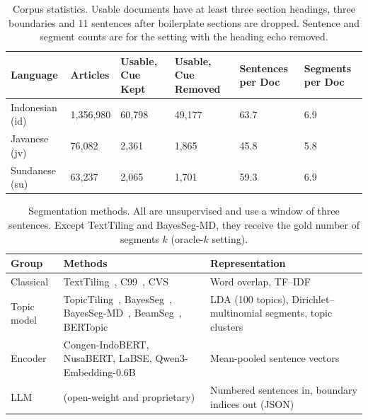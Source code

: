 \begin{table}[H]
\caption{Corpus statistics. Usable documents have at least three section headings, three boundaries and 11 sentences after boilerplate sections are dropped. Sentence and segment counts are for the setting with the heading echo removed.\label{tab:corpus}}
\begin{tabularx}{\textwidth}{lCCCCC}
\toprule
\textbf{Language} & \textbf{Articles} & \textbf{Usable, Cue Kept} & \textbf{Usable, Cue Removed} & \textbf{Sentences per Doc} & \textbf{Segments per Doc}\\
\midrule
Indonesian (id) & 1,356,980 & 60,798 & 49,177 & 63.7 & 6.9\\
Javanese (jv)   & 76,082    & 2,361  & 1,865  & 45.8 & 5.8\\
Sundanese (su)  & 63,237    & 2,065  & 1,701  & 59.3 & 6.9\\
\bottomrule
\end{tabularx}
\end{table}

\begin{table}[H]
\caption{Segmentation methods. All are unsupervised and use a window of three sentences. Except TextTiling and BayesSeg-MD, they receive the gold number of segments $k$ (oracle-$k$ setting).\label{tab:methods}}
\begin{tabularx}{\textwidth}{lLL}
\toprule
\textbf{Group} & \textbf{Methods} & \textbf{Representation}\\
\midrule
Classical   & TextTiling~\cite{hearst1997}, C99~\cite{choi2000}, CVS~\cite{alemi2015} & Word overlap, TF--IDF\\
Topic model & TopicTiling~\cite{riedl2012}, BayesSeg~\cite{du2013}, BayesSeg-MD~\cite{mota2016}, BeamSeg~\cite{mota2019}, BERTopic~\cite{grootendorst2022} & LDA (100 topics), Dirichlet--multinomial segments, topic clusters\\
Encoder     & Congen-IndoBERT, NusaBERT, LaBSE, Qwen3-Embedding-0.6B & Mean-pooled sentence vectors\\
LLM         & \tbd{} (open-weight and proprietary) & Numbered sentences in, boundary indices out (JSON)\\
\bottomrule
\end{tabularx}
\end{table}

